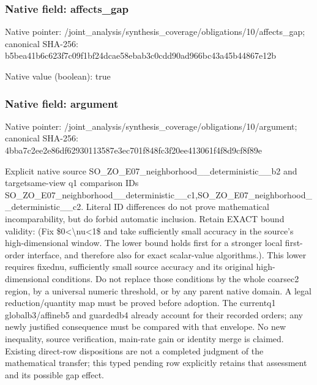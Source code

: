 \documentclass[10pt,a4paper]{article}
\begin{document}
\subsubsection{Native field: affects\_\allowbreak{}gap}
Native pointer: /joint\_\allowbreak{}analysis/synthesis\_\allowbreak{}coverage/obligations/10/affects\_\allowbreak{}gap; canonical SHA-256: b5bea41b6c623f7c09f1bf24dcae58ebab3c0cdd90ad966bc43a45b44867e12b

Native value (boolean): true

\subsubsection{Native field: argument}
Native pointer: /joint\_\allowbreak{}analysis/synthesis\_\allowbreak{}coverage/obligations/10/argument; canonical SHA-256: 4bba7c2ee2e86df62930113587e3ec701f848fc3f20ee413061f4f8d9cf8f89e

\begingroup\raggedright\sloppy Explicit native source SO\_\allowbreak{}ZO\_\allowbreak{}E07\_\allowbreak{}neighborhood\_\allowbreak{}\_\allowbreak{}deterministic\_\allowbreak{}\_\allowbreak{}b2 and targetsame-view q1 comparison IDs SO\_\allowbreak{}ZO\_\allowbreak{}E07\_\allowbreak{}neighborhood\_\allowbreak{}\_\allowbreak{}deterministic\_\allowbreak{}\_\allowbreak{}c1,\allowbreak{}SO\_\allowbreak{}ZO\_\allowbreak{}E07\_\allowbreak{}neighborhood\_\allowbreak{}\_\allowbreak{}deterministic\_\allowbreak{}\_\allowbreak{}c2. Literal ID differences do not prove mathematical incomparability,\allowbreak{} but do forbid automatic inclusion. Retain EXACT bound validity:\allowbreak{} (Fix \$0<\textbackslash{}nu<1\$ and take sufficiently small accuracy in the source's high-dimensional window. The lower bound holds first for a stronger local first-order interface,\allowbreak{} and therefore also for exact scalar-value algorithms.). This lower requires fixednu,\allowbreak{} sufficiently small source accuracy and its original high-dimensional conditions. Do not replace those conditions by the whole coarsec2 region,\allowbreak{} by a universal numeric threshold,\allowbreak{} or by any parent native domain. A legal reduction/\allowbreak{}quantity map must be proved before adoption. The currentq1 globalb3/\allowbreak{}affineb5 and guardedb4 already account for their recorded orders;\allowbreak{} any newly justified consequence must be compared with that envelope. No new inequality,\allowbreak{} source verification,\allowbreak{} main-rate gain or identity merge is claimed. Existing direct-row dispositions are not a completed judgment of the mathematical transfer;\allowbreak{} this typed pending row explicitly retains that assessment and its possible gap effect.\par\endgroup
\end{document}
